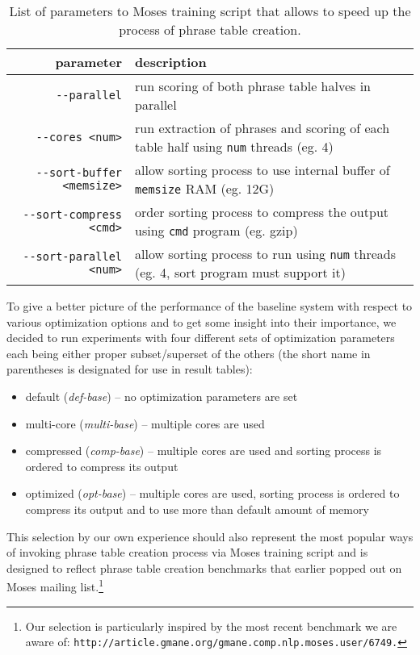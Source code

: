 \begin{table}[ht]
\centering
\begin{tabular}{ r p{86mm} }
parameter & description \\
\hline
\hline
\verb|--parallel|               & run scoring of both phrase table halves in parallel \\
\verb|--cores <num>|            & run extraction of phrases and scoring of each table half using \verb|num| threads (eg. 4) \\
\verb|--sort-buffer <memsize>|  & allow sorting process to use internal buffer of \verb|memsize| RAM (eg. 12G)\\
\verb|--sort-compress <cmd>|    & order sorting process to compress the output using \verb|cmd| program (eg. gzip) \\
\verb|--sort-parallel <num>|    & allow sorting process to run using \verb|num| threads (eg. 4, sort program must support it)\\
\hline
\hline
\end{tabular}
\caption{\label{baseline-optimization-parameters}
List of parameters to Moses training script that allows to speed up
the process of phrase table creation.}
\end{table}

To give a better picture of the performance of the baseline system with respect
to various optimization options and to get some insight into their importance,
we decided to run experiments with four different sets of optimization parameters
each being either proper subset/superset of the others (the short name in
parentheses is designated for use in result tables):
\begin{itemize}
  \item default (\emph{def-base}) -- no optimization parameters are set
  \item multi-core (\emph{multi-base}) -- multiple cores are used
  \item compressed (\emph{comp-base}) -- multiple cores are used and
    sorting process is ordered to compress its output
  \item optimized (\emph{opt-base}) -- multiple cores are used, sorting process
    is ordered to compress its output and to use more than default amount of memory
\end{itemize}

This selection by our own experience should also represent the most popular ways of
invoking phrase table creation process via Moses training script and is designed to
reflect phrase table creation benchmarks that earlier popped out on Moses mailing
list.\footnote{Our selection is particularly inspired by the most recent benchmark
we are aware of: \tt{http://article.gmane.org/gmane.comp.nlp.moses.user/6749}.}

